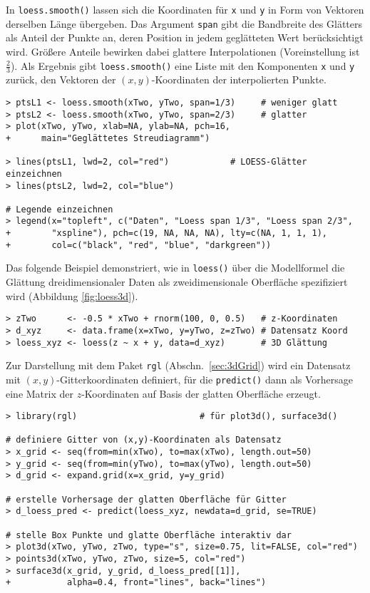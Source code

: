 In \lstinline!loess.smooth()! lassen sich die Koordinaten für \lstinline!x! und \lstinline!y! in Form von Vektoren derselben Länge übergeben. Das Argument \lstinline!span! gibt die Bandbreite des Glätters als Anteil der Punkte an, deren Position in jedem geglätteten Wert berücksichtigt wird. Größere Anteile bewirken dabei glattere Interpolationen (Voreinstellung ist $\frac{2}{3}$). Als Ergebnis gibt \lstinline!loess.smooth()! eine Liste mit den Komponenten \lstinline!x! und \lstinline!y! zurück, den Vektoren der $(x, y)$-Koordinaten der interpolierten Punkte.
\begin{lstlisting}
> ptsL1 <- loess.smooth(xTwo, yTwo, span=1/3)     # weniger glatt
> ptsL2 <- loess.smooth(xTwo, yTwo, span=2/3)     # glatter
> plot(xTwo, yTwo, xlab=NA, ylab=NA, pch=16,
+      main="Geglättetes Streudiagramm")

> lines(ptsL1, lwd=2, col="red")            # LOESS-Glätter einzeichnen
> lines(ptsL2, lwd=2, col="blue")

# Legende einzeichnen
> legend(x="topleft", c("Daten", "Loess span 1/3", "Loess span 2/3",
+        "xspline"), pch=c(19, NA, NA, NA), lty=c(NA, 1, 1, 1),
+        col=c("black", "red", "blue", "darkgreen"))
\end{lstlisting}

Das folgende Beispiel demonstriert, wie in \lstinline!loess()! über die Modellformel die Glättung dreidimensionaler Daten als zweidimensionale Oberfläche spezifiziert wird (Abbildung \ref{fig:loess3d}).
\begin{lstlisting}
> zTwo      <- -0.5 * xTwo + rnorm(100, 0, 0.5)   # z-Koordinaten
> d_xyz     <- data.frame(x=xTwo, y=yTwo, z=zTwo) # Datensatz Koord
> loess_xyz <- loess(z ~ x + y, data=d_xyz)       # 3D Glättung
\end{lstlisting}

Zur Darstellung mit dem Paket  \lstinline!rgl! (Abschn.\ \ref{sec:3dGrid}) wird ein Datensatz mit $(x, y)$-Gitterkoordinaten definiert, für die \lstinline!predict()! dann als Vorhersage eine Matrix der $z$-Koordinaten auf Basis der glatten Oberfläche erzeugt.
\begin{lstlisting}
> library(rgl)                        # für plot3d(), surface3d()

# definiere Gitter von (x,y)-Koordinaten als Datensatz
> x_grid <- seq(from=min(xTwo), to=max(xTwo), length.out=50)
> y_grid <- seq(from=min(yTwo), to=max(yTwo), length.out=50)
> d_grid <- expand.grid(x=x_grid, y=y_grid)

# erstelle Vorhersage der glatten Oberfläche für Gitter
> d_loess_pred <- predict(loess_xyz, newdata=d_grid, se=TRUE)

# stelle Box Punkte und glatte Oberfläche interaktiv dar
> plot3d(xTwo, yTwo, zTwo, type="s", size=0.75, lit=FALSE, col="red")
> points3d(xTwo, yTwo, zTwo, size=5, col="red")
> surface3d(x_grid, y_grid, d_loess_pred[[1]],
+           alpha=0.4, front="lines", back="lines")
\end{lstlisting}

